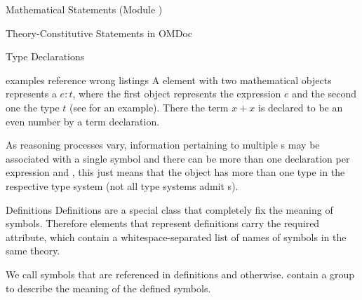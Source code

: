 \begin{tchapter}[id=statements,short=Mathematical Statements]{Mathematical Statements (Module {})}
\begin{tsection}[id=definitions]{Theory-Constitutive Statements in OMDoc}
\begin{tsubsection}[id=type-axioms]{Type Declarations}
\begin{erratum}[reported-by=Christoph Lange,date=2010-01-11]{examples reference wrong listings}
  A {} element with two mathematical objects represents a
  {} $e\colon t$, where the first object represents the
  expression $e$ and the second one the type $t$ (see {} for an
  example). There the term $x+x$ is declared to be an even number by a term declaration.
\end{erratum}

  As reasoning processes vary, information pertaining to multiple
  {s} may be associated with a single symbol and there can
  be more than one {} declaration per expression and
  {}, this just means that the object has more than one type
  in the respective type system (not all type systems admit
  {s}).
\end{tsubsection}

\begin{tsubsection}[id=definitions]{Definitions}
  Definitions are a special class {} that completely fix the meaning of
  symbols.  Therefore {} elements that represent definitions carry the
  required {} attribute, which contain a whitespace-separated
  list of names of symbols in the same theory. 

  We call symbols that are referenced in definitions
  {} and
  {} otherwise. {} contain
  a {} {} group to describe the meaning of the defined
  symbols.


\end{tsubsection}
\end{tsection}
\end{tchapter}
